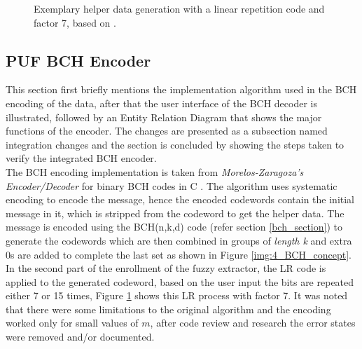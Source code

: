 \begin{figure}[h]
\centering
{}
\caption{Exemplary helper data generation with a linear repetition code and factor 7, based on \cite{10}.}
\label{img:4_LR_HD}
\end{figure}


\subsection{PUF BCH Encoder}
This section first briefly mentions the implementation algorithm used in the BCH encoding of the data, after that the user interface of the BCH decoder is illustrated, followed by an Entity Relation Diagram that shows the major functions of the encoder. The changes are presented as a subsection named integration changes and the section is concluded by showing the steps taken to verify the integrated BCH encoder.\\

The BCH encoding implementation is taken from \emph{Morelos-Zaragoza's Encoder/Decoder} for binary BCH codes in C \cite{69}. The algorithm uses systematic encoding to encode the message, hence the encoded codewords contain the initial message in it, which is stripped from the codeword to get the helper data. The message is encoded using the BCH(n,k,d) code (refer section \ref{bch_section}) to generate the codewords which are then combined in groups of \emph{length k} and extra 0s are added to
complete the last set as shown in Figure \ref{img:4_BCH_concept}. In the
second part of the enrollment of the fuzzy extractor, the LR code is applied to the generated codeword, based on the user input the bits are repeated either 7 or 15 times, Figure \ref{img:4_LR_HD} shows this LR process with factor 7. It was noted that there were some limitations to the original algorithm and the encoding worked only for small values of $m$, after code review and research the error states were removed and/or documented.

